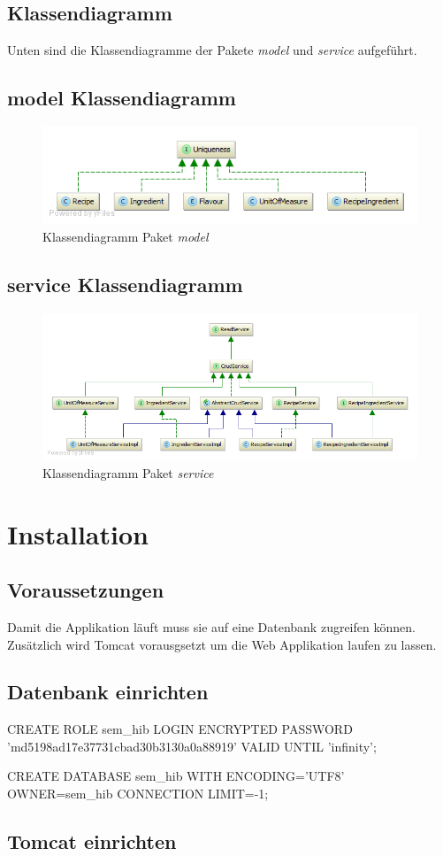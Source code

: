 \subsection{Klassendiagramm}
Unten sind die Klassendiagramme der Pakete \emph{model} und \emph{service} aufgeführt.

\subsection{model Klassendiagramm}

\begin{figure}[h]
\centering
\includegraphics[width=0.6\columnwidth]{graphics/model_Klassendiagramm.png}%
	\caption{Klassendiagramm Paket \emph{model}}
	\label{fig:model_Klassendiagramm}
\end{figure}

\subsection{service Klassendiagramm}
\begin{figure}[h]
\centering
\includegraphics[width=0.6\columnwidth]{graphics/service_Klassendiagramm.png}%
	\caption{Klassendiagramm Paket \emph{service}}
	\label{fig:service_Klassendiagramm}
\end{figure}

\section{Installation}

\subsection{Voraussetzungen}
Damit die Applikation läuft muss sie auf eine Datenbank zugreifen können. Zusätzlich wird Tomcat vorausgsetzt um die Web Applikation laufen zu lassen.

\subsection{Datenbank einrichten}

CREATE ROLE sem_hib LOGIN ENCRYPTED PASSWORD 'md5198ad17e37731cbad30b3130a0a88919'
   VALID UNTIL 'infinity';
	
CREATE DATABASE sem_hib
  WITH ENCODING='UTF8'
       OWNER=sem_hib
       CONNECTION LIMIT=-1;

	
	

\subsection{Tomcat einrichten}


